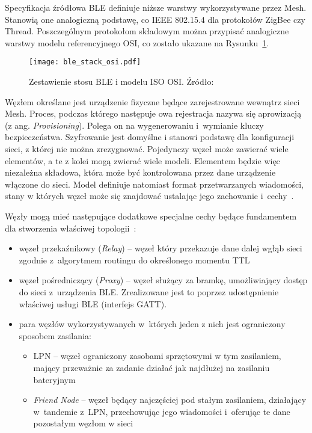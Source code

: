 Specyfikacja źródłowa BLE definiuje niższe warstwy wykorzystywane przez Mesh. Stanowią one analogiczną podstawę,
co IEEE 802.15.4 dla protokołów ZigBee czy Thread. Poszczególnym protokołom składowym można przypisać analogiczne
warstwy modelu referencyjnego OSI, co zostało ukazane na Rysunku~\ref{rys:agregacja_protokolow_ble}.

\begin{figure}[!ht]
	\centering \texttt{[image: ble\_stack\_osi.pdf]} 
	\caption{Zestawienie stosu BLE i modelu ISO OSI. Źródło: \cite{noauthor_bluetooth_nodate}}
	\label{rys:agregacja_protokolow_ble}
\end{figure}


Węzłem określane jest urządzenie fizyczne będące zarejestrowane wewnątrz sieci Mesh. Proces, podczas którego 
następuje owa rejestracja nazywa się aprowizacją (z ang. \textit{Provisioning}). Polega on na wygenerowaniu
i~wymianie kluczy bezpieczeństwa. Szyfrowanie jest domyślne i stanowi podstawę dla konfiguracji sieci,
z której nie można zrezygnować. Pojedynczy węzeł może zawierać wiele elementów,
a te z kolei mogą zwierać wiele modeli. Elementem będzie więc niezależna składowa, która może być kontrolowana
przez dane urządzenie włączone do sieci. Model definiuje natomiast format przetwarzanych wiadomości, stany w których
węzeł może się znajdować ustalając jego zachowanie i~cechy~\cite{woolley_bluetooth_2020, st_an5292_2021}.

Węzły mogą mieć następujące dodatkowe specjalne cechy będące fundamentem dla stworzenia właściwej topologii~\cite{woolley_bluetooth_2020, st_an5292_2021}:
\begin{itemize}
\item węzeł przekaźnikowy (\textit{Relay}) -- węzeł który przekazuje dane dalej wgłąb sieci zgodnie z~algorytmem routingu do określonego momentu \gls{TTL}
\item węzeł pośredniczący (\textit{Proxy}) -- węzeł służący za bramkę, umożliwiający dostęp do sieci z~urządzenia BLE. Zrealizowane jest to poprzez
udostępnienie właściwej usługi BLE (interfejs GATT).
\item para węzłów wykorzystywanych w~których jeden z nich jest ograniczony sposobem zasilania:
	\begin{itemize}
	\item \gls{LPN} -- węzeł ograniczony zasobami sprzętowymi w tym zasilaniem, mający przeważnie za zadanie działać jak najdłużej na zasilaniu bateryjnym
	\item \textit{Friend Node} -- węzeł będący najczęściej pod stałym zasilaniem, działający w~tandemie z~\gls{LPN}, przechowując jego wiadomości
	i~oferując te dane pozostałym węzłom w sieci
	\end{itemize}
\end{itemize}

